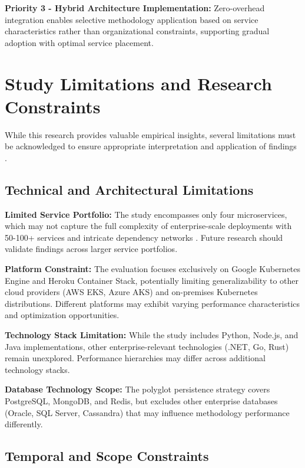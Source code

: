 \textbf{Priority 3 - Hybrid Architecture Implementation:}
Zero-overhead integration enables selective methodology application based on service characteristics rather than organizational constraints, supporting gradual adoption with optimal service placement.

\section{Study Limitations and Research Constraints}
\label{sec:study_limitations}

While this research provides valuable empirical insights, several limitations must be acknowledged to ensure appropriate interpretation and application of findings \cite{research_validity_framework}.

\subsection{Technical and Architectural Limitations}
\label{subsec:technical_limitations}

\textbf{Limited Service Portfolio:} The study encompasses only four microservices, which may not capture the full complexity of enterprise-scale deployments with 50-100+ services and intricate dependency networks \cite{microservices_patterns}. Future research should validate findings across larger service portfolios.

\textbf{Platform Constraint:} The evaluation focuses exclusively on Google Kubernetes Engine and Heroku Container Stack, potentially limiting generalizability to other cloud providers (AWS EKS, Azure AKS) and on-premises Kubernetes distributions. Different platforms may exhibit varying performance characteristics and optimization opportunities.

\textbf{Technology Stack Limitation:} While the study includes Python, Node.js, and Java implementations, other enterprise-relevant technologies (.NET, Go, Rust) remain unexplored. Performance hierarchies may differ across additional technology stacks.

\textbf{Database Technology Scope:} The polyglot persistence strategy covers PostgreSQL, MongoDB, and Redis, but excludes other enterprise databases (Oracle, SQL Server, Cassandra) that may influence methodology performance differently.

\subsection{Temporal and Scope Constraints}
\label{subsec:temporal_constraints}

